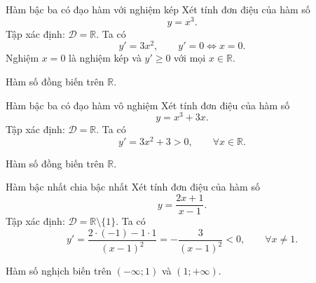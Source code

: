 \begin{vidu}{Hàm bậc ba có đạo hàm với nghiệm kép}
Xét tính đơn điệu của hàm số
\[
y=x^3.
\]
Tập xác định: $\mathcal{D}=\mathbb{R}$. Ta có
\[
y'=3x^2,\qquad y'=0\Leftrightarrow x=0.
\]
Nghiệm $x=0$ là nghiệm kép và $y'\ge0$ với mọi $x\in\mathbb{R}$.

\begin{center}
\end{center}

Hàm số đồng biến trên $\mathbb{R}$.
\end{vidu}

\begin{vidu}{Hàm bậc ba có đạo hàm vô nghiệm}
Xét tính đơn điệu của hàm số
\[
y=x^3+3x.
\]
Tập xác định: $\mathcal{D}=\mathbb{R}$. Ta có
\[
y'=3x^2+3>0,\qquad \forall x\in\mathbb{R}.
\]

\begin{center}
\end{center}

Hàm số đồng biến trên $\mathbb{R}$.
\end{vidu}

\begin{vidu}{Hàm bậc nhất chia bậc nhất}
Xét tính đơn điệu của hàm số
\[
y=\frac{2x+1}{x-1}.
\]
Tập xác định: $\mathcal{D}=\mathbb{R}\setminus\{1\}$. Ta có
\[
y'=\frac{2\cdot(-1)-1\cdot1}{(x-1)^2}
=-\frac{3}{(x-1)^2}<0,\qquad \forall x\ne1.
\]

\begin{center}
\end{center}

Hàm số nghịch biến trên $(-\infty;1)$ và $(1;+\infty)$.
\end{vidu}

